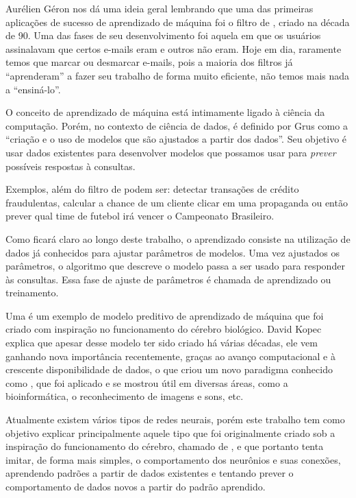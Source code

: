 Aurélien Géron \citep{hands} nos dá uma ideia geral lembrando que uma das primeiras aplicações de sucesso de aprendizado de máquina foi o filtro de , criado na década de 90. Uma das fases de seu desenvolvimento foi aquela em que os usuários assinalavam que certos e-mails eram  e outros não eram. Hoje em dia, raramente temos que marcar ou desmarcar e-mails, pois a maioria dos filtros já ``aprenderam'' a fazer seu trabalho de forma muito eficiente, não temos mais nada a ``ensiná-lo''.

O conceito de aprendizado de máquina está intimamente ligado à ciência da computação. Porém, no contexto de ciência de dados, é definido por Grus \citep{data} como a ``criação e o uso de modelos que são ajustados a partir dos dados''. Seu objetivo é usar dados existentes para desenvolver modelos que possamos usar para \emph{prever} possíveis respostas à consultas. 

Exemplos, além do filtro de  podem ser: detectar transações de crédito fraudulentas, calcular a chance de um cliente clicar em uma propaganda ou então prever qual time de futebol irá vencer o Campeonato Brasileiro.

Como ficará claro ao longo deste trabalho, o aprendizado consiste na utilização de dados já conhecidos para ajustar parâmetros de modelos. Uma vez ajustados os parâmetros, o algoritmo que descreve o modelo passa a ser usado para responder às consultas. Essa fase de ajuste de parâmetros é chamada de aprendizado ou treinamento. 

Uma  é um exemplo de modelo preditivo de aprendizado de máquina que foi criado com inspiração no funcionamento do cérebro biológico. David Kopec \citep{classic} explica que apesar desse modelo ter sido criado há várias décadas, ele vem ganhando nova importância recentemente, graças ao avanço computacional e à crescente disponibilidade de dados, o que criou um novo paradigma conhecido como , que foi aplicado e se mostrou útil em diversas áreas, como a bioinformática, o reconhecimento de imagens e sons, etc.

Atualmente existem vários tipos de redes neurais, porém este trabalho tem como objetivo explicar principalmente aquele tipo que foi originalmente criado sob a inspiração do funcionamento do cérebro, chamado de , e que portanto tenta imitar, de forma mais simples, o comportamento dos neurônios e suas conexões, aprendendo padrões a partir de dados existentes e tentando prever o comportamento de dados novos a partir do padrão aprendido.

